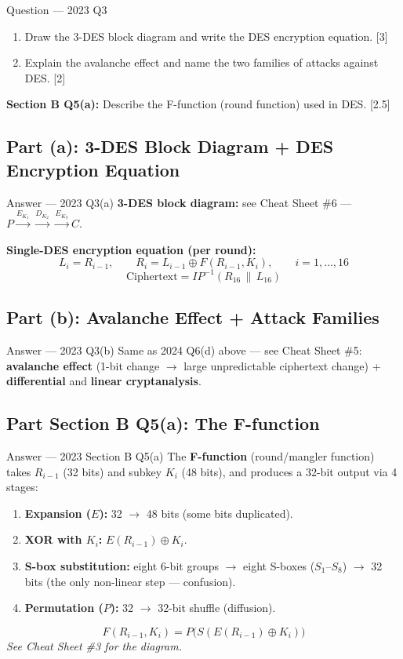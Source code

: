 \documentclass[12pt,a4paper]{article}
\begin{document}
\begin{qbox}{Question --- 2023 Q3}
\begin{enumerate}[label=(\alph*)]
  \item Draw the 3-DES block diagram and write the DES encryption equation. \hfill [3]
  \item Explain the avalanche effect and name the two families of attacks against DES. \hfill [2]
\end{enumerate}
\noindent\textbf{Section B Q5(a):} Describe the F-function (round function) used in DES. \hfill [2.5]
\end{qbox}

\subsection{Part (a): 3-DES Block Diagram + DES Encryption Equation}
\begin{solbox}{Answer --- 2023 Q3(a)}
\textbf{3-DES block diagram:} see Cheat Sheet \#6 --- $P \xrightarrow{E_{K_1}} \xrightarrow{D_{K_2}} \xrightarrow{E_{K_3}} C$.

\textbf{Single-DES encryption equation (per round):}
\[
L_i = R_{i-1}, \qquad R_i = L_{i-1} \oplus F(R_{i-1}, K_i), \qquad i = 1,\dots,16
\]
\[
\text{Ciphertext} = IP^{-1}(R_{16} \,\|\, L_{16})
\]
\end{solbox}

\subsection{Part (b): Avalanche Effect + Attack Families}
\begin{solbox}{Answer --- 2023 Q3(b)}
Same as 2024 Q6(d) above --- see Cheat Sheet \#5: \textbf{avalanche effect} (1-bit change $\to$ large unpredictable ciphertext change) + \textbf{differential} and \textbf{linear cryptanalysis}.
\end{solbox}

\subsection{Part Section B Q5(a): The F-function}
\begin{solbox}{Answer --- 2023 Section B Q5(a)}
The \textbf{F-function} (round/mangler function) takes $R_{i-1}$ (32 bits) and subkey $K_i$ (48 bits), and produces a 32-bit output via 4 stages:
\begin{enumerate}[noitemsep]
  \item \textbf{Expansion ($E$):} 32 $\to$ 48 bits (some bits duplicated).
  \item \textbf{XOR with $K_i$:} $E(R_{i-1}) \oplus K_i$.
  \item \textbf{S-box substitution:} eight 6-bit groups $\to$ eight S-boxes ($S_1$--$S_8$) $\to$ 32 bits (the only non-linear step --- confusion).
  \item \textbf{Permutation ($P$):} 32 $\to$ 32-bit shuffle (diffusion).
\end{enumerate}
\[
F(R_{i-1},K_i) = P\big(S(E(R_{i-1}) \oplus K_i)\big)
\]
\textit{See Cheat Sheet \#3 for the diagram.}
\end{solbox}
\end{document}
